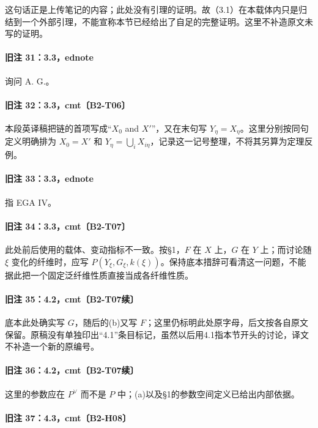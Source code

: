 这句话正是上传笔记的内容；此处没有引理的证明。故（3.1）在本载体内只是归结到一个外部引理，不能宣称本节已经给出了自足的完整证明。这里不补造原文未写的证明。

\paragraph{旧注 31：3.3，ednote}

询问 A. G.。

\paragraph{旧注 32：3.3，cmt〔B2-T06〕}

本段英译稿把链的首项写成“$X_0$ and $X'$”，又在末句写 $Y_\eta=X_\eta$。这里分别按同句定义明确排为 $X_0=X'$ 和 $Y_\eta=\bigcup_iX_{i\eta}$，记录这一记号整理，不将其另算为定理反例。

\paragraph{旧注 33：3.3，ednote}

指 EGA IV。

\paragraph{旧注 34：3.3，cmt〔B2-T07〕}

此处前后使用的载体、变动指标不一致。按§1，$F$ 在 $X$ 上，$G$ 在 $Y$ 上；而讨论随 $\xi$ 变化的纤维时，应写 $P(Y_\xi,G_\xi,k(\xi))$。保持底本措辞可看清这一问题，不能据此把一个固定泛纤维性质直接当成各纤维性质。

\paragraph{旧注 35：4.2，cmt〔B2-T07续〕}

底本此处确实写 $G$，随后的(b)又写 $F$；这里仍标明此处原字母，后文按各自原文保留。原稿没有单独印出“4.1”条目标记，虽然以后用4.1指本节开头的讨论，译文不补造一个新的原编号。

\paragraph{旧注 36：4.2，cmt〔B2-T07续〕}

这里的参数应在 $P^\vee$ 而不是 $P$ 中；(a)以及§1的参数空间定义已给出内部依据。

\paragraph{旧注 37：4.3，cmt〔B2-H08〕}

